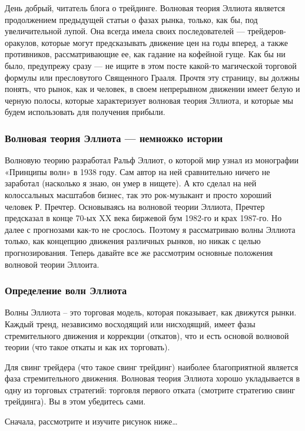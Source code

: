 \documentclass[a5paper]{article}
\begin{document}
День добрый, читатель блога о трейдинге. Волновая теория Эллиота
является продолжением предыдущей статьи о фазах рынка, только, как бы,
под увеличительной лупой. Она всегда имела своих последователей —
трейдеров-оракулов, которые могут предсказывать движение цен на годы
вперед, а также противников, рассматривающие ее, как гадание на
кофейной гуще. Как бы ни было, предупрежу сразу — не ищите в этом
посте какой-то магической торговой формулы или пресловутого Священного
Грааля. Прочтя эту страницу, вы должны понять, что рынок, как и
человек, в своем непрерывном движении имеет белую и черную  полосы,
которые характеризует волновая теория Эллиота, и которые мы будем
использовать для получения прибыли.

\subsubsection{Волновая теория Эллиота — немножко истории}

Волновую теорию разработал Ральф Эллиот, о которой мир узнал из
монографии «Принципы волн» в 1938 году. Сам автор на ней сравнительно
ничего не заработал (насколько я знаю, он умер в нищете). А кто сделал
на ней колоссальных масштабов бизнес, так это рок-музыкант и просто
хороший человек Р. Пречтер. Основываясь на волновой теории Эллиота,
Пречтер предсказал в конце 70-ых XX века биржевой бум 1982-го и крах
1987-го. Но далее с прогнозами как-то не срослось. Поэтому я
рассматриваю волны Эллиота только, как концепцию движения различных
рынков, но никак с целью прогнозирования. Теперь давайте все же
рассмотрим основные положения волновой теории Эллоита.

\subsubsection{Определение волн Эллиота}

Волны Эллиота – это торговая модель, которая показывает, как движутся рынки. Каждый тренд, независимо восходящий или нисходящий, имеет фазы стремительного движения и коррекции (откатов), что и есть основой волновой теории (что такое откаты  и как их торговать).

Для свинг трейдера (что такое свинг трейдинг) наиболее благоприятной является фаза стремительного движения. Волновая теория Эллиота хорошо укладывается в одну из торговых стратегий: торговля первого отката (смотрите стратегию свинг трейдинга). Вы в этом убедитесь сами.

Сначала, рассмотрите и изучите рисунок ниже…
\end{document}
